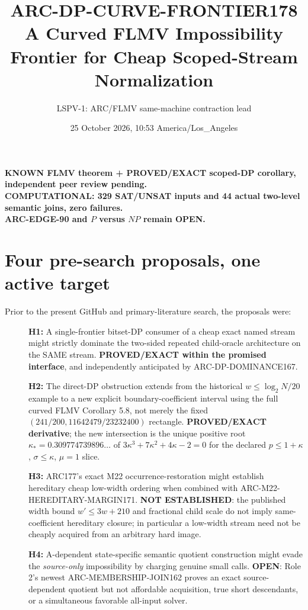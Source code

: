 \documentclass[11pt]{article}
\title{ARC-DP-CURVE-FRONTIER178\\
\large A Curved FLMV Impossibility Frontier for Cheap Scoped-Stream Normalization}
\author{LSPV-1: ARC/FLMV same-machine contraction lead}
\date{25 October 2026, 10:53 America/Los\_Angeles}
\begin{document}
\maketitle
\begin{center}
\textbf{KNOWN FLMV theorem + PROVED/EXACT scoped-DP corollary, independent peer review pending.}\\
\textbf{COMPUTATIONAL: 329 SAT/UNSAT inputs and 44 actual two-level semantic joins, zero failures.}\\
\textbf{ARC-EDGE-90 and $P$ versus $NP$ remain OPEN.}
\end{center}

\section{Four pre-search proposals, one active target}
Prior to the present GitHub and primary-literature search, the proposals were:
\begin{description}
\item[] \textbf{H1:} A single-frontier bitset-DP consumer of a cheap exact named stream might strictly dominate the two-sided repeated child-oracle architecture on the SAME stream. \textbf{PROVED/EXACT within the promised interface}, and independently anticipated by ARC-DP-DOMINANCE167.
\item[] \textbf{H2:} The direct-DP obstruction extends from the historical $w\le\log_2N/20$ example to a new explicit boundary-coefficient interval using the full curved FLMV Corollary 5.8, not merely the fixed $(241/200,11642479/23232400)$ rectangle. \textbf{PROVED/EXACT derivative}; the new intersection is the unique positive root $\kappa_*=0.309774739896\ldots$ of $3\kappa^3+7\kappa^2+4\kappa-2=0$ for the declared $p\le1+\kappa$, $\sigma\le\kappa$, $\mu=1$ slice.
\item[] \textbf{H3:} ARC177's exact M22 occurrence-restoration might establish hereditary cheap low-width ordering when combined with ARC-M22-HEREDITARY-MARGIN171. \textbf{NOT ESTABLISHED}: the published width bound $w'\le3w+210$ and fractional child scale do not imply same-coefficient hereditary closure; in particular a low-width stream need not be cheaply acquired from an arbitrary hard image.
\item[] \textbf{H4:} A-dependent state-specific semantic quotient construction might evade the \emph{source-only} impossibility by charging genuine small calls. \textbf{OPEN}: Role 2's newest ARC-MEMBERSHIP-JOIN162 proves an exact source-dependent quotient but not affordable acquisition, true short descendants, or a simultaneous favorable all-input solver.
\end{description}
\end{document}
